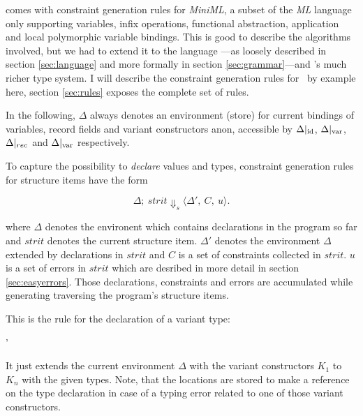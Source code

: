 \citet{haackwells04} comes with constraint generation rules for
\textsl{MiniML}, a subset of the \textsl{ML} language only supporting
variables, infix operations, functional abstraction, application and local
polymorphic variable bindings.
This is good to describe the algorithms involved, but we had to extend it to the
language \camlm---as loosely described in section \ref{sec:language} and more
formally in section \ref{sec:grammar}---and \easyocaml's much richer type
system.
I will describe the constraint generation rules for \easyocaml\ by example
here, section \ref{sec:rules} exposes the complete set of rules.

In the following, $\Delta$ always denotes an environment (store) for current
bindings of variables, record fields and variant constructors anon, accessible
by $\Delta|_{\text{id}}$, $\Delta|_{\text{var}}$, $\Delta|_{rec}$ and $\Delta|_{\text{var}}$
respectively.

To capture the possibility to \emph{declare} values and types, constraint
generation rules for structure items have the form

\[ \Delta;\ strit \Downarrow_s \langle \Delta',\ C,\ u\rangle.\]

\noindent where $\Delta$ denotes the environent which contains declarations in
the program so far and $strit$ denotes the current structure item.
$\Delta'$ denotes the environment $\Delta$ extended by declarations in $strit$
and $C$ is a set of constraints collected in $strit$.
$u$ is a set of errors in $strit$ which are desribed in more detail in section
\ref{sec:easyerrors}.
Those declarations, constraints and errors are accumulated while generating
traversing the program's structure items.

This is the rule for the declaration of a variant type:

\vspace{1em}\centerline{
{\styjudge {} {\Delta'} \emptyset \emptyset}}
\vspace{1em}

\noindent It just extends the current environment $\Delta$ with the variant constructors
$K_1$ to $K_n$ with the given types.
Note, that the locations are stored to make a reference on the type declaration
in case of a typing error related to one of those variant constructors.

